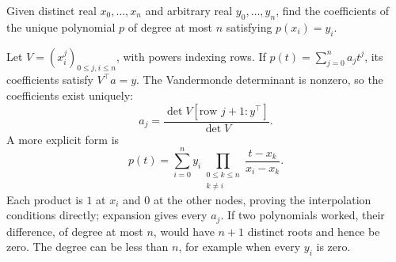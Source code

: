 \begin{problem}\label{ex:07:interpolation}
Given distinct real \(x_0,\ldots,x_n\) and arbitrary real \(y_0,\ldots,y_n\),
find the coefficients of the unique polynomial \(p\) of degree at most
\(n\) satisfying \(p(x_i)=y_i\).
\end{problem}
\begin{solution}
Let \(V=(x_i^j)_{0\leqslant j,i\leqslant n}\), with powers indexing rows.
If \(p(t)=\sum_{j=0}^n a_jt^j\), its coefficients satisfy \(V^\top a=y\).
The Vandermonde determinant is nonzero, so the coefficients exist uniquely:
\[
 a_j=\frac{\det V[\text{row }j+1:y^\top]}{\det V}.
\]
A more explicit form is
\[
 p(t)=\sum_{i=0}^n y_i
       \prod_{\substack{0\leqslant k\leqslant n\\k\ne i}}
                  \frac{t-x_k}{x_i-x_k}.
\]
Each product is \(1\) at \(x_i\) and \(0\) at the other nodes, proving the
interpolation conditions directly; expansion gives every \(a_j\).
If two polynomials worked, their difference, of degree at most \(n\),
would have \(n+1\) distinct roots and hence be zero. The degree can be
less than \(n\), for example when every \(y_i\) is zero.
\end{solution}


